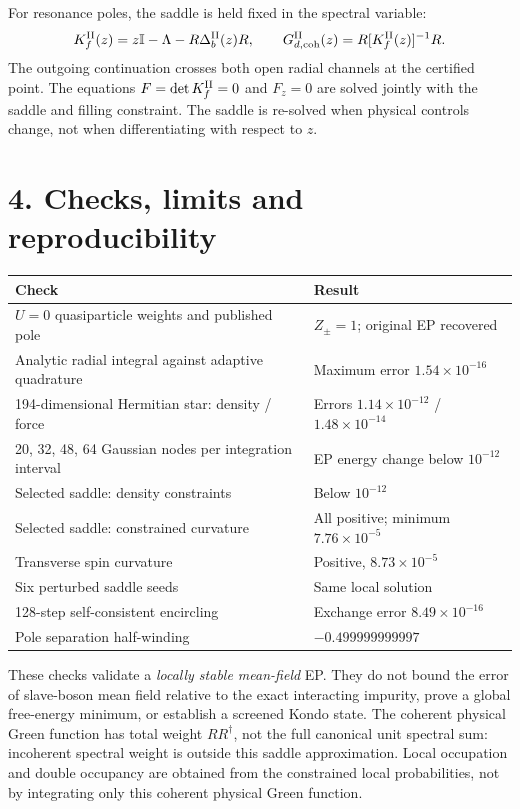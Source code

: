 \documentclass[11pt]{article}
\newcommand{\Id}{\mathbb I}
\begin{document}
For resonance poles, the saddle is held fixed in the spectral variable:
\begin{equation}
K_f^{\rm II}(z)=z\Id-\Lambda-R\Delta_b^{\rm II}(z)R,
\qquad G_{d,\rm coh}^{\rm II}(z)=R[K_f^{\rm II}(z)]^{-1}R.
\end{equation}
The outgoing continuation crosses both open radial channels at the certified
point. The equations $F=\det K_f^{\rm II}=0$ and $F_z=0$ are solved jointly with
the saddle and filling constraint. The saddle is re-solved when physical
controls change, not when differentiating with respect to $z$.

\newpage
\section*{4. Checks, limits and reproducibility}
\begin{center}
\begin{tabular}{p{}p{}}
\toprule
Check & Result\\
\midrule
$U=0$ quasiparticle weights and published pole & $Z_\pm=1$; original EP recovered\\
Analytic radial integral against adaptive quadrature & Maximum error $1.54\times10^{-16}$\\
194-dimensional Hermitian star: density / force & Errors $1.14\times10^{-12}$ / $1.48\times10^{-14}$\\
20, 32, 48, 64 Gaussian nodes per integration interval & EP energy change below $10^{-12}$\\
Selected saddle: density constraints & Below $10^{-12}$\\
Selected saddle: constrained curvature & All positive; minimum $7.76\times10^{-5}$\\
Transverse spin curvature & Positive, $8.73\times10^{-5}$\\
Six perturbed saddle seeds & Same local solution\\
128-step self-consistent encircling & Exchange error $8.49\times10^{-16}$\\
Pole separation half-winding & $-0.499999999997$\\
\bottomrule
\end{tabular}
\end{center}

These checks validate a \emph{locally stable mean-field} EP. They do not bound
the error of slave-boson mean field relative to the exact interacting impurity,
prove a global free-energy minimum, or establish a screened Kondo state.
The coherent physical Green function has total weight $RR^\dagger$, not the
full canonical unit spectral sum: incoherent spectral weight is outside this
saddle approximation. Local occupation and double occupancy are obtained
from the constrained local probabilities, not by integrating only this
coherent physical Green function.
\end{document}
